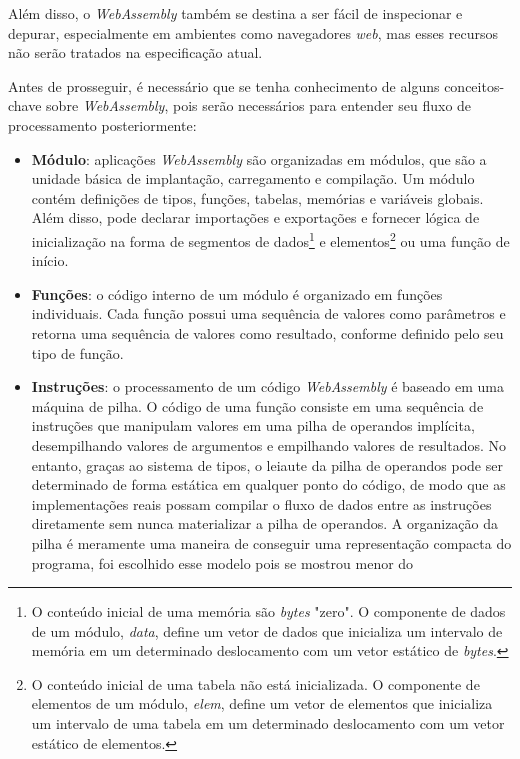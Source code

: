 Além disso, o \textit{WebAssembly} também se destina a ser fácil de inspecionar e depurar,
especialmente em ambientes como navegadores \textit{web}, mas esses recursos não serão
tratados na especificação atual. \cite{wa}

Antes de prosseguir, é necessário que se tenha conhecimento de alguns conceitos-chave
sobre \textit{WebAssembly}, pois serão necessários para entender seu fluxo de
processamento posteriormente:

\begin{itemize}
    \item \textbf{Módulo}: aplicações \textit{WebAssembly} são organizadas em módulos, que
    são a unidade básica de implantação, carregamento e compilação. Um módulo contém
    definições de tipos, funções, tabelas, memórias e variáveis globais. Além disso, pode
    declarar importações e exportações e fornecer lógica de inicialização na forma de
    segmentos de dados\footnote[1]{O conteúdo inicial de uma memória são \textit{bytes}
    "zero". O componente de dados de um módulo, \textit{data}, define um vetor de dados
    que inicializa um intervalo de memória em um determinado deslocamento com um vetor
    estático de \textit{bytes}.} e elementos\footnote[2]{O conteúdo inicial de uma tabela
    não está inicializada. O componente de elementos de um módulo, \textit{elem}, define
    um vetor de elementos que inicializa um intervalo de uma tabela em um determinado
    deslocamento com um vetor estático de elementos.} ou uma função de início.
    \item \textbf{Funções}: o código interno de um módulo é organizado em funções
    individuais. Cada função possui uma sequência de valores como parâmetros e retorna uma
    sequência de valores como resultado, conforme definido pelo seu tipo de função.
    \item \textbf{Instruções}: o processamento de um código \textit{WebAssembly} é baseado
    em uma máquina de pilha. O código de uma função consiste em uma sequência de
    instruções que manipulam valores em uma pilha de operandos implícita, desempilhando
    valores de argumentos e empilhando valores de resultados. No entanto, graças ao
    sistema de tipos, o leiaute da pilha de operandos pode ser determinado de forma
    estática em qualquer ponto do código, de modo que as implementações reais possam
    compilar o fluxo de dados entre as instruções diretamente sem nunca materializar a
    pilha de operandos. A organização da pilha é meramente uma maneira de conseguir uma
    representação compacta do programa, foi escolhido esse modelo pois se mostrou menor do

\end{itemize}
